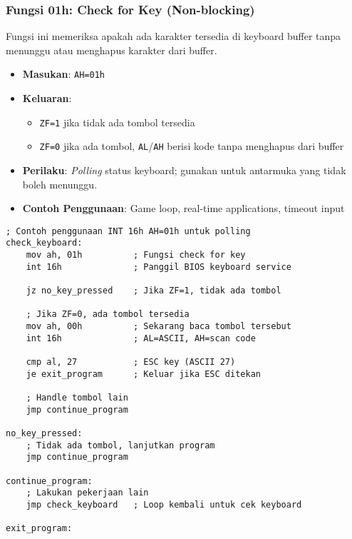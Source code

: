 \documentclass[../main.tex]{subfiles}
\begin{document}
\subsubsection{Fungsi 01h: Check for Key (Non-blocking)}
Fungsi ini memeriksa apakah ada karakter tersedia di keyboard buffer tanpa menunggu atau menghapus karakter dari buffer.

\begin{itemize}
    \item \textbf{Masukan}: \texttt{AH=01h}
    \item \textbf{Keluaran}: 
        \begin{itemize}
            \item \texttt{ZF=1} jika tidak ada tombol tersedia
            \item \texttt{ZF=0} jika ada tombol, \texttt{AL}/\texttt{AH} berisi kode tanpa menghapus dari buffer
        \end{itemize}
    \item \textbf{Perilaku}: \textit{Polling} status keyboard; gunakan untuk antarmuka yang tidak boleh menunggu.
    \item \textbf{Contoh Penggunaan}: Game loop, real-time applications, timeout input
\end{itemize}

\begin{lstlisting}[language={[x86masm]Assembler}, caption=Fungsi 01h - Check for Key Non-blocking, label={lst:int16h-01h}]
; Contoh penggunaan INT 16h AH=01h untuk polling
check_keyboard:
    mov ah, 01h          ; Fungsi check for key
    int 16h              ; Panggil BIOS keyboard service
    
    jz no_key_pressed    ; Jika ZF=1, tidak ada tombol
    
    ; Jika ZF=0, ada tombol tersedia
    mov ah, 00h          ; Sekarang baca tombol tersebut
    int 16h              ; AL=ASCII, AH=scan code
    
    cmp al, 27           ; ESC key (ASCII 27)
    je exit_program      ; Keluar jika ESC ditekan
    
    ; Handle tombol lain
    jmp continue_program
    
no_key_pressed:
    ; Tidak ada tombol, lanjutkan program
    jmp continue_program
    
continue_program:
    ; Lakukan pekerjaan lain
    jmp check_keyboard   ; Loop kembali untuk cek keyboard
    
exit_program:
\end{lstlisting}
\end{document}
